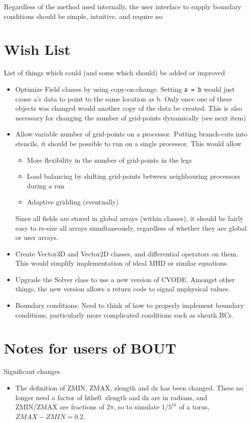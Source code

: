\documentclass[12pt, a4paper]{article}
\newcommand{\code}[1]{\texttt{#1}}
\begin{document}
Regardless of the method used internally, the user interface to
supply boundary conditions should be simple, intuitive, and
require no 

\section{Wish List}

List of things which could (and some which should) be added or improved

\begin{itemize}
\item Optimize Field classes by using copy-on-change. Setting \code{a = b} would just
  cause a's data to point to the same location as b. Only once one of these objects
  was changed would another copy of the data be created. This is also necessary for
  changing the number of grid-points dynamically (see next item)
\item Allow variable number of grid-points on a processor. Putting branch-cuts into stencils,
 it should be possible to run on a single processor. This would allow
  \begin{itemize}
    \item More flexibility in the number of grid-points in the legs
    \item Load balancing by shifting grid-points between neighbouring processors during a run
    \item Adaptive gridding (eventually)
  \end{itemize}
  Since all fields are stored in global arrays (within classes), it should be fairly easy
  to re-size all arrays simultaneously, regardless of whether they are global or user arrays.
\item Create Vector3D and Vector2D classes, and differential operators on them. This would simplify
implementation of ideal MHD or similar equations.
\item Upgrade the Solver class to use a new version of CVODE. Amongst other things, the
new version allows a return code to signal unphysical values.
\item Boundary conditions: Need to think of how to properly implement boundary conditions,
particularly more complicated conditions such as sheath BCs.
\end{itemize}

\section{Notes for users of BOUT}

Significant changes

\begin{itemize}
\item The definition of ZMIN, ZMAX, zlength and dz has been changed. These no longer
need a factor of hthe0. zlength and dz are in radians, and ZMIN/ZMAX are
fractions of $2\pi$, so to simulate $1/5^{th}$ of a torus, $ZMAX-ZMIN = 0.2$.
\end{itemize}



\end{document}
